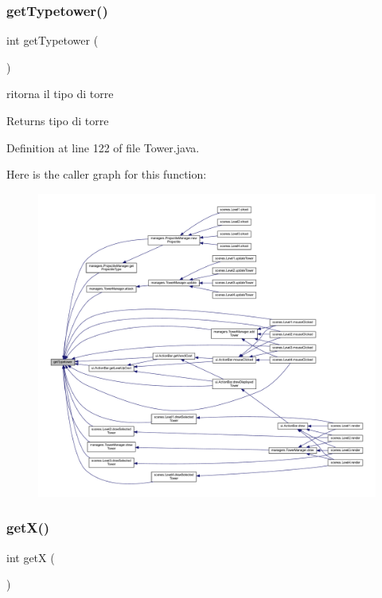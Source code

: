 \subsubsection{\texorpdfstring{get\+Typetower()}{getTypetower()}}
{\footnotesize\ttfamily int get\+Typetower (\begin{DoxyParamCaption}{ }\end{DoxyParamCaption})}



ritorna il tipo di torre 

\begin{DoxyReturn}{Returns}
tipo di torre 
\end{DoxyReturn}


Definition at line 122 of file Tower.\+java.

Here is the caller graph for this function\+:
\nopagebreak
\begin{figure}[H]
\begin{center}
\leavevmode
\includegraphics[width=350pt]{classtowers_1_1_tower_adaa3345598ef202753372f185625e5da_icgraph}
\end{center}
\end{figure}
\mbox{\label{classtowers_1_1_tower_ae13f88e922e1339355456062ad9fa359}} 
\subsubsection{\texorpdfstring{get\+X()}{getX()}}
{\footnotesize\ttfamily int getX (\begin{DoxyParamCaption}{ }\end{DoxyParamCaption})}



